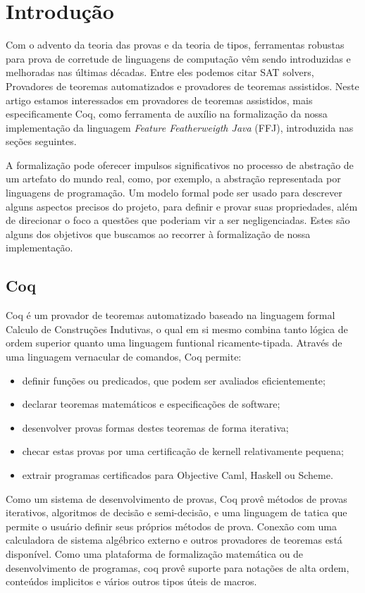 \chapter{Introdução}
Com o advento da teoria das provas e da teoria de tipos, ferramentas robustas para prova de corretude de linguagens de computação vêm sendo introduzidas e melhoradas nas últimas décadas. Entre eles podemos citar SAT solvers, Provadores de teoremas automatizados e provadores de teoremas assistidos.
Neste artigo estamos interessados em provadores de teoremas assistidos, mais especificamente 
Coq, como ferramenta de auxílio na formalização da nossa implementação da linguagem 
\textit{Feature Featherweigth Java} (FFJ), introduzida nas seções seguintes. 

A formalização pode oferecer impulsos significativos no processo de abstração de um artefato
do mundo real, como, por exemplo, a abstração representada por linguagens de programação. 
Um modelo formal pode ser usado 
para descrever alguns aspectos precisos do projeto, para definir e provar suas propriedades, 
além de direcionar o foco a questões que poderiam vir a ser negligenciadas. 
Estes são alguns dos objetivos que buscamos ao recorrer à formalização de nossa implementação.

	\section{Coq}
	Coq é um provador de teoremas automatizado  baseado na linguagem formal Calculo de Construções Indutivas, o qual em si mesmo combina tanto lógica de ordem superior quanto uma linguagem funtional ricamente-tipada. Através de uma linguagem vernacular de comandos, Coq permite:
	\begin{itemize}
		\item definir funções ou predicados, que podem ser avaliados eficientemente;
		\item declarar teoremas matemáticos e especificações de software;
		\item desenvolver provas formas destes teoremas de forma iterativa;
		\item checar estas provas por uma certificação de kernell relativamente pequena;
		\item extrair programas certificados para Objective Caml, Haskell ou Scheme.
	\end{itemize}
	Como um sistema de desenvolvimento de provas, Coq provê métodos de provas iterativos, algoritmos de decisão e semi-decisão, e uma linguagem de tatica que permite o usuário definir seus próprios métodos de prova. Conexão com uma calculadora de sistema algébrico externo e outros provadores de teoremas está disponível.
	Como uma plataforma de formalização matemática ou de desenvolvimento de programas, coq provê suporte para notações de alta ordem, conteúdos implicitos e vários outros tipos úteis de macros.

